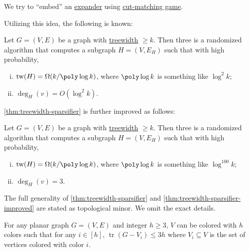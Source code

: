 \begin{intuition}
	We try to ``embed'' an \hyperref[def:expander]{expander} using \hyperref[def:cut-matching-game]{cut-matching game}.
\end{intuition}

Utilizing this idea, the following is known:

\begin{theorem}\label{thm:treewidth-sparsifier}
	Let \(G = (V, E)\) be a graph with \hyperref[def:treewidth]{treewidth} \(\geq k\). Then three is a randomized algorithm that computes a subgraph \(H = (V, E_H)\) such that with high probability,
	\begin{enumerate}[(i)]
		\item \(\operatorname{tw}(H) = \Omega (k / \poly \log k)\), where \(\poly \log k\) is something like \(\log ^2 k\);
		\item \(\deg_H(v) = O(\log ^2 k)\).
	\end{enumerate}
\end{theorem}

\autoref{thm:treewidth-sparsifier} is further improved as follows:

\begin{theorem}\label{thm:treewidth-sparsifier-improved}
	Let \(G = (V, E)\) be a graph with \hyperref[def:treewidth]{treewidth} \(\geq k\). Then three is a randomized algorithm that computes a subgraph \(H = (V, E_H)\) such that with high probability,
	\begin{enumerate}[(i)]
		\item \(\operatorname{tw}(H) = \Omega (k / \poly \log k)\), where \(\poly \log k\) is something like \(\log ^{100} k\);
		\item \(\deg_H(v) = 3\).
	\end{enumerate}
\end{theorem}

\begin{remark}
	The full generality of \autoref{thm:treewidth-sparsifier} and \autoref{thm:treewidth-sparsifier-improved} are stated as topological minor. We omit the exact details.
\end{remark}


\begin{theorem}\label{thm:treewidth-planar-graph-color}
	For any planar graph \(G = (V, E)\) and integer \(h \geq 3\), \(V\) can be colored with \(h\) colors such that for any \(i \in [h]\), \(\operatorname{tr}(G - V_i) \leq 3h\) where \(V_i \subseteq V\) is the set of vertices colored with color \(i\).
\end{theorem}

